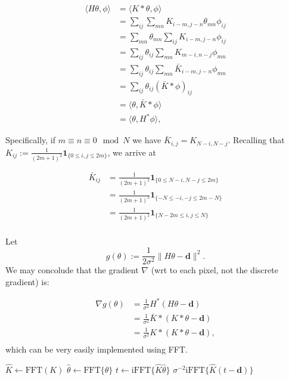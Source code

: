 \documentclass[paper=a4, fontsize=11pt]{scrartcl} %
\numberwithin{equation}{section} %
\numberwithin{figure}{section} %
\numberwithin{table}{section} %
\newcommand{\data}{\mathbf{d}}
\newcommand{\param}{\theta}
\newcommand{\paramm}{\phi}
\newcommand{\fft}{\text{FFT}}
\newcommand{\ifft}{\text{i}\fft}
\begin{document}
\begin{align*}
  \langle H\param,\paramm \rangle &= \langle K * \param, \paramm \rangle\\
  &= \sum_{ij} \sum_{mn} K_{i-m,j-n}\param_{mn} \paramm_{ij} \\
  &= \sum_{mn} \param_{mn} \sum_{ij} K_{i-m,j-n} \paramm_{ij} \\
  &= \sum_{ij} \param_{ij} \sum_{mn} K_{m-i,n-j} \paramm_{mn} \\
  &= \sum_{ij} \param_{ij} \sum_{mn} \bar{K}_{i-m,j-n} \paramm_{mn} \\
  &= \sum_{ij} \param_{ij} (\bar{K} * \paramm)_{ij} \\
  &= \langle \param , \bar{K} *\paramm \rangle \\
  &= \langle \param, H^{*} \paramm \rangle,
\end{align*}

Specifically, if $m \equiv n \equiv 0 \mod N$ we have $\bar{K}_{i,j} =
K_{N-i,N-j}$. Recalling that $K_{ij} := \frac{1}{ (2m+1)^2 }
\mathbf{1}_{\{ 0 \leq i,j \leq 2m \} }$, we arrive at

\begin{align*}
  \bar{K}_{ij} &= \frac{1}{ (2m+1)^2 } \mathbf{1}_{\{ 0 \leq N-i,N-j \leq 2m \} } \\
  &= \frac{1}{ (2m+1)^2 } \mathbf{1}_{\{ -N \leq -i,-j \leq 2m -N\} } \\
  &= \frac{1}{ (2m+1)^2 } \mathbf{1}_{\{ N-2m \leq i,j \leq N \} } \\
\end{align*}

Let
\begin{equation*}
  g(\param) := \frac{1}{2\sigma^2} \|H\param - \data \|^2.
\end{equation*}
We may concolude that the gradient $\nabla$ (wrt to each pixel, not
the discrete gradient) is:

\begin{align*}
  \nabla g(\theta) &= \frac{1}{\sigma^2} H^{*}(H\param - \data ) \\
  &= \frac{1}{\sigma^2} \bar{K} * (K*\param - \data )\\
  &= \frac{1}{\sigma^2} K * (K*\param - \data),\\
\end{align*}
which can be very easily implemented using FFT.


\begin{algorithm}
  \caption{$\nabla g(\theta)$}
  \begin{algorithmic}
    \Procedure{Gradient}{$\param$}
    \State $\hat K \gets \fft(K)$
    \State $\hat \param \gets \fft\{ \param \}$
    \State $t \gets \ifft \{ \hat{K} \hat{\param }\}$
    \State \Return $\sigma^{-2}\ifft \{ \hat{K}(t - \data ) \}$
    \EndProcedure
  \end{algorithmic}
\end{algorithm}
\end{document}
